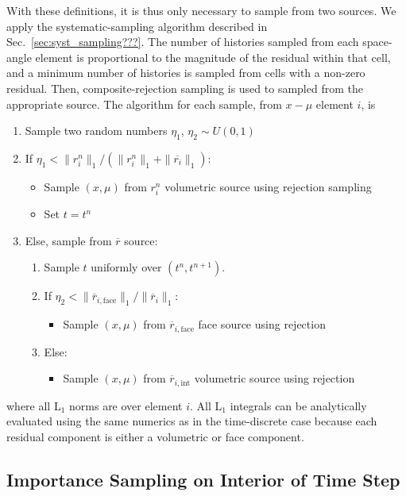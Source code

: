 With these definitions, it is thus only necessary to sample from two sources.  We apply
the systematic-sampling algorithm described in Sec.~\ref{sec:syst_sampling???}.  The
number of histories sampled from each space-angle element is proportional to the magnitude
of the residual within that cell, and a minimum number of histories is sampled from cells
with a non-zero residual.  Then, composite-rejection sampling is used to sampled from the
appropriate source.  The algorithm for each sample, from $x-\mu$ element $i$, is 
\begin{enumerate}
    \item Sample two random numbers $\eta_1$, $\eta_2\sim U(0,1)$ 
    \item If $\eta_1 < \|r_i^{n}\|_1/(\|r_i^{n}\|_1 + \|\overline{r_i}\|_1)$:
    \begin{itemize}
        \item Sample $(x,\mu)$ from $r_i^{n}$ volumetric source using rejection sampling
        \item Set $t=t^n$
    \end{itemize}
\item Else, sample from $\overline r$ source:
    \begin{enumerate}
        \item \label{itm:time_step}Sample $t$ uniformly over $(t^{n},t^{n+1})$.
        \item If $\eta_2 < \|\overline{r}_{i,\text{face}}\|_1/\|\overline{r}_{i}\|_1$:
            \begin{itemize}
                \item Sample $(x,\mu)$ from $\overline r_{i,\text{face}}$ face source using rejection
            \end{itemize}
        \item Else:
            \begin{itemize}
                \item Sample $(x,\mu)$ from $\overline r_{i,\text{int}}$ volumetric source using rejection
            \end{itemize}
    \end{enumerate}
\end{enumerate}
where all L$_1$ norms are over element $i$.  All L$_1$ integrals can be analytically
evaluated using the same numerics as in the
time-discrete case because each residual component is either a volumetric or face
component.  

\subsection{Importance Sampling on Interior of Time Step}
\label{sec:imp_sampling}

